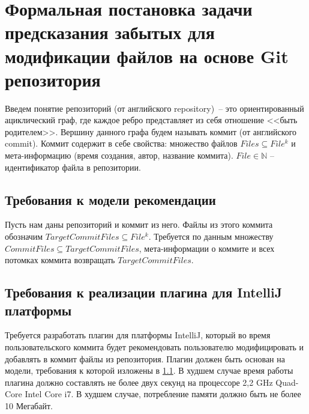 \section{Формальная постановка задачи предсказания забытых для модификации файлов на основе Git репозитория}
Введем понятие репозиторий (от английского repository)~-- это ориентированный ациклический граф, где каждое ребро представляет из себя отношение <<быть родителем>>. Вершину данного графа будем называть коммит (от английского commit). Коммит содержит в себе свойства: множество файлов $Files \subseteq File^k$ и мета-информацию (время создания, автор, название коммита). $File \in \mathbb{N}$ -- идентификатор файла в репозитории.\\
\subsection{Требования к модели рекомендации}\label{ml-model-req}
Пусть нам даны репозиторий и коммит из него. Файлы из этого коммита обозначим $TargetCommitFiles \subseteq File^k$. Требуется по данным множеству $CommitFiles \subseteq TargetCommitFiles$, мета-информации о коммите и всех потомках коммита возвращать $TargetCommitFiles$.
\subsection{Требования к реализации плагина для IntelliJ платформы}\label{impl-req}
Требуется разработать плагин для платформы IntelliJ, который во время пользовательского коммита будет рекомендовать пользователю модифицировать и добавлять в коммит файлы из репозитория. Плагин должен быть основан на модели, требования к которой изложены в \ref{ml-model-req}. В худшем случае время работы плагина должно составлять не более двух секунд на процессоре 2,2 GHz Quad-Core Intel Core i7. В худшем случае, потребление памяти должно быть не более 10 Мегабайт.

